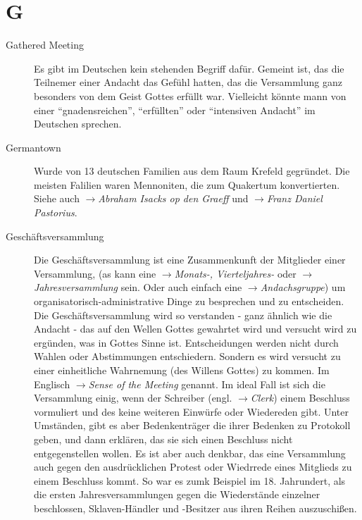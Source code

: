 \section*{G}

\articlesize

\begin{description}

\item[Gathered Meeting] Es gibt im Deutschen kein stehenden Begriff dafür.
Gemeint ist, das die Teilnemer einer Andacht das Gefühl hatten, das die
Versammlung ganz besonders von dem Geist Gottes erfüllt war. Vielleicht könnte
mann von einer "`gnadensreichen"', "`erfüllten"' oder "`intensiven Andacht"'
im Deutschen sprechen. 

\item[Germantown] Wurde von 13 deutschen Familien aus dem Raum Krefeld gegründet.
Die meisten Falilien waren Mennoniten, die zum Quakertum konvertierten. Siehe
auch $\to$\textit{Abraham Isacks op den Graeff} und $\to$\textit{Franz Daniel
Pastorius}.

 \item[Geschäftsversammlung] Die Geschäftsversammlung ist eine Zusammenkunft
 der Mitglieder einer Versammlung, (as kann eine $\to$\textit{Monats-,
 Vierteljahres-} oder $\to$\textit{Jahresversammlung} sein. Oder auch einfach
 eine $\to$\textit{Andachsgruppe}) um organisatorisch-administrative Dinge
 zu besprechen und zu entscheiden.
 \medskip
 Die Geschäftsversammlung wird so verstanden - ganz ähnlich wie die Andacht -
 das auf den Wellen Gottes gewahrtet wird und versucht wird zu ergünden, was
 in Gottes Sinne ist. Entscheidungen werden nicht durch Wahlen oder Abstimmungen
 entschiedern. Sondern es wird versucht zu einer einheitliche Wahrnemung (des
 Willens Gottes) zu kommen. Im Englisch $\to$\textit{Sense of the Meeting}
 genannt. Im ideal Fall ist sich die Versammlung einig, wenn der Schreiber
 (engl. $\to$\textit{Clerk}) einem Beschluss vormuliert und des keine weiteren
 Einwürfe oder Wiedereden gibt. Unter Umständen, gibt es aber Bedenkenträger
 die ihrer Bedenken zu Protokoll geben, und dann erklären, das sie sich einen
 Beschluss nicht entgegenstellen wollen. Es ist aber auch denkbar, das eine
 Versammlung auch gegen den ausdrücklichen Protest oder Wiedrrede eines
 Mitglieds zu einem Beschluss kommt. So war es zumk Beispiel im 18. Jahrundert,
 als die ersten Jahresversammlungen gegen die Wiederstände einzelner beschlossen,
 Sklaven-Händler und -Besitzer aus ihren Reihen auszuschißen. 


\end{description}

